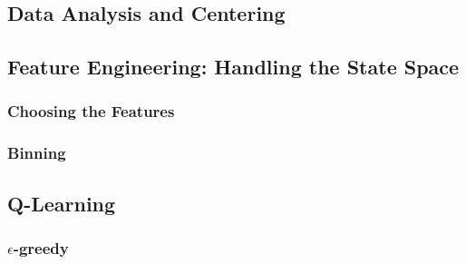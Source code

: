 \documentclass[10pt]{article}
\begin{document}
\subsection{Data Analysis and Centering} 



\subsection{Feature Engineering: Handling the State Space} 

\subsubsection{Choosing the Features}

\subsubsection{Binning}

\subsection{Q-Learning}

\subsubsection{$\epsilon$-greedy}
\end{document}

